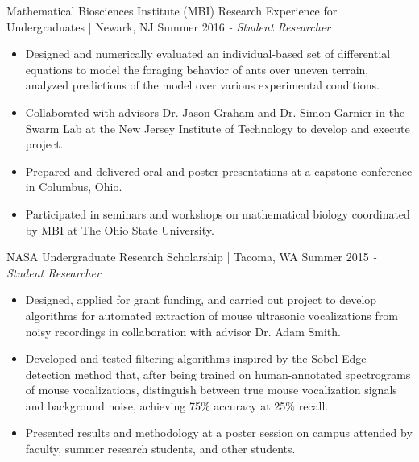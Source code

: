 Mathematical Biosciences Institute (MBI) Research Experience for Undergraduates | Newark, NJ \hfill Summer 2016 \newline
\textit{- Student Researcher} \\
  \vspace{-4.5mm}
 \begin{itemize}
 \item Designed and numerically evaluated an individual-based set of differential equations to model the foraging behavior of ants over uneven terrain, analyzed predictions of the model over various experimental conditions.
  \item Collaborated with advisors Dr. Jason Graham and Dr. Simon Garnier in the Swarm Lab at the New Jersey Institute of Technology to develop and execute project.
 \item Prepared and delivered oral and poster presentations at a capstone conference in Columbus, Ohio.
 \item Participated in seminars and workshops on mathematical biology coordinated by MBI at The Ohio State University.
 \end{itemize}
  \vspace{-3.5mm}

NASA Undergraduate Research Scholarship | Tacoma, WA \hfill Summer 2015 \newline
\textit{- Student Researcher} \\
  \vspace{-4.5mm}
 \begin{itemize}
 \item Designed, applied for grant funding, and carried out project to develop algorithms for automated extraction of mouse ultrasonic vocalizations from noisy recordings in collaboration with advisor Dr. Adam Smith.
 \item Developed and tested filtering algorithms inspired by the Sobel Edge detection method that, after being trained on human-annotated spectrograms of mouse vocalizations, distinguish between true mouse vocalization signals and background noise, achieving 75\% accuracy at 25\% recall.
 \item Presented results and methodology at a poster session on campus attended by faculty, summer research students, and other students.
 \end{itemize}
  \vspace{-3.5mm}

